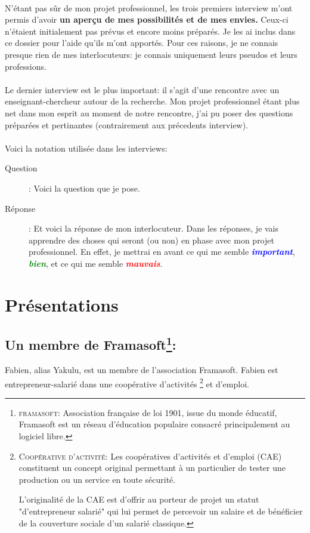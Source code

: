 \documentclass[a4paper,12pt, draft]{report}
\newcommand{\goodPoint}[1]{\textcolor{green}{\textbf{\textit{#1}}}}
\newcommand{\badPoint}[1]{\textcolor{red}{\textbf{\textit{#1}}}}
\newcommand{\importantPoint}[1]{\textcolor{blue}{\textbf{\textit{#1}}}}
\begin{document}
\paragraph{}
N'étant pas sûr de mon projet professionnel, les trois premiers interview m'ont permis d'avoir \textbf{un aperçu de mes possibilités et de mes envies.} Ceux-ci n'étaient initialement pas prévus et encore moins préparés. Je les ai inclus dans ce dossier pour l'aide qu'ils m'ont apportés.
Pour ces raisons, je ne connais presque rien de mes interlocuteurs: je connais uniquement leurs pseudos et leurs professions.

\paragraph{}
Le dernier interview est le plus important: il s'agit d'une rencontre avec un enseignant-chercheur autour de la recherche. Mon projet professionnel étant plus net dans mon esprit au moment de notre rencontre, j'ai pu poser des questions préparées et pertinantes (contrairement aux précedents interview).

\paragraph{}
Voici la notation utilisée dans les interviews:
\begin{description}
\item [Question]: Voici la question que je pose.
\item [Réponse]: Et voici la réponse de mon interlocuteur. Dans les réponses, je vais apprendre des choses qui seront (ou non) en phase avec mon projet professionnel. En effet, je mettrai en avant ce qui me semble \importantPoint{important}, \goodPoint{bien}, et ce qui me semble \badPoint{mauvais}.
\end{description}


\section{Présentations}
\subsection[Un membre de framasoft]{Un membre de Framasoft\footnote{\textsc{framasoft}: Association française de loi 1901, issue du monde éducatif, Framasoft est un réseau d'éducation populaire consacré principalement au logiciel libre. }: }
Fabien, alias Yakulu, est un membre de l'association Framasoft. Fabien est entrepreneur-salarié dans une coopérative d'activités \footnote{\textsc{Coopérative d'activité}: Les coopératives d'activités et d'emploi (CAE) constituent un concept original permettant à un particulier de tester une production ou un service en toute sécurité.

L'originalité de la CAE est d'offrir au porteur de projet un statut "d'entrepreneur salarié" qui lui permet de percevoir un salaire et de bénéficier de la couverture sociale d'un salarié classique.} et d'emploi.
\end{document}
